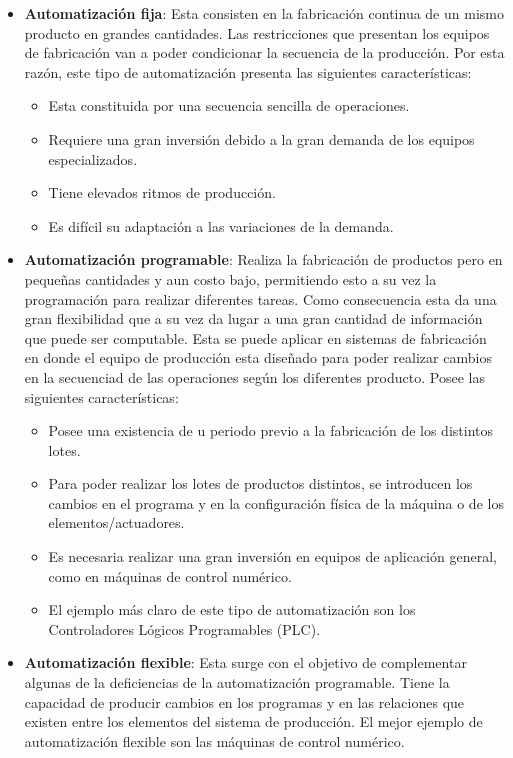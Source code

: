 \begin{itemize}
  \item \textbf{Automatización fija}: Esta consisten en la fabricación continua de un mismo producto en grandes cantidades. Las restricciones que presentan los equipos de fabricación van a poder condicionar la secuencia de la producción. Por esta razón, este tipo de automatización presenta las siguientes características: 
  \begin{itemize}
  \item Esta constituida por una secuencia sencilla de operaciones.
  \item Requiere una gran inversión debido a la gran demanda de los equipos especializados.
  \item Tiene elevados ritmos de producción.
  \item Es difícil su adaptación a las variaciones de la demanda.
  \end{itemize}
  
  \item \textbf{Automatización programable}: Realiza la fabricación de productos pero en pequeñas cantidades y aun costo bajo, permitiendo esto a su vez la programación para realizar diferentes tareas. Como consecuencia esta da una gran flexibilidad que a su vez da lugar a una gran cantidad de información que puede ser computable. Esta se puede aplicar en sistemas de fabricación en donde el equipo de producción esta diseñado para poder realizar cambios en la secuenciad de las operaciones según los diferentes producto. Posee las siguientes características:
  \begin{itemize}
  \item Posee una existencia de u periodo previo a la fabricación de los distintos lotes.
  \item Para poder realizar los lotes de productos distintos, se introducen los cambios en el programa y en la configuración física de la máquina o de los elementos/actuadores.
  \item Es necesaria realizar una gran inversión en equipos de aplicación general, como en máquinas de control numérico.
  \item El ejemplo más claro de este tipo de automatización son los Controladores Lógicos Programables (PLC).
  \end{itemize}
  
  \item \textbf{Automatización flexible}: Esta surge con el objetivo de complementar algunas de la deficiencias de la automatización programable. Tiene la capacidad de producir cambios en los programas y en las relaciones que existen entre los elementos del sistema de producción. El mejor ejemplo de automatización flexible son las máquinas de control numérico.
  

\end{itemize}

